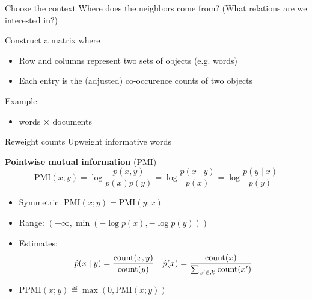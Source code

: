 \documentclass[usenames,dvipsnames,notes]{beamer}
\begin{document}
\begin{frame}
    {Choose the context}
    Where does the neighbors come from? (What relations are we interested in?)

    Construct a matrix where\\
    \begin{itemize}
        \item Row and columns represent two sets of objects (e.g. words)
        \item Each entry is the (adjusted) co-occurence counts of two objects
    \end{itemize}

    Example:\\
    \begin{itemize}
        \item words $\times$ documents
    \end{itemize}
    \vspace{7em}
\end{frame}

\begin{frame}
    {Reweight counts}
    Upweight informative words

    \textbf{Pointwise mutual information} (PMI)
    $$
    \text{PMI}(x;y) = \log \frac{p(x,y)}{p(x)p(y)}
    = \log\frac{p(x\mid y)}{p(x)}
    = \log\frac{p(y\mid x)}{p(y)}
    $$
    \vspace{-1em}
    \begin{itemize}
        \itemsep1em
        \item Symmetric: $\text{PMI}(x;y)=\text{PMI}(y;x)$
        \item Range: $(-\infty, \min(-\log p(x), -\log p(y)))$
        \item Estimates:
            \begin{align*}
            \hat{p}(x\mid y) = \frac{\text{count}(x,y)}{\text{count}(y)}\quad
            \hat{p}(x) = \frac{\text{count}(x)}{\sum_{x'\in\mathcal{X}}\text{count}(x')}
            \end{align*}
        \item $\text{PPMI}(x;y) \eqdef \max(0, \text{PMI}(x;y))$
    \end{itemize}
\end{frame}
\end{document}
